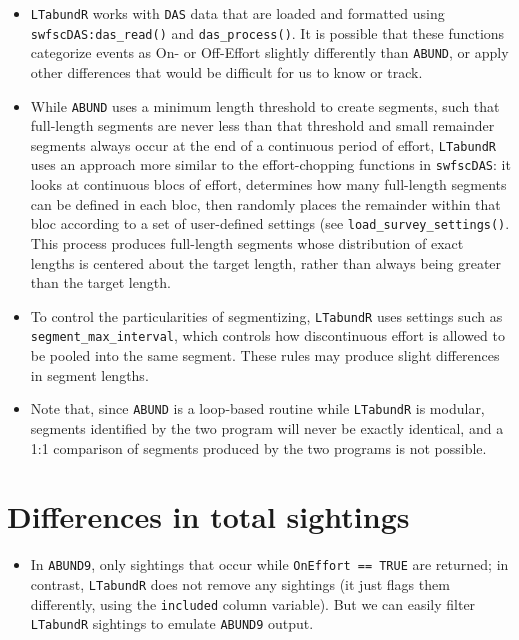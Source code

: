 \documentclass[
]{book}
\providecommand{\tightlist}{%
  \setlength{\itemsep}{0pt}\setlength{\parskip}{0pt}}
\begin{document}
\begin{itemize}
\item
  \texttt{LTabundR} works with \texttt{DAS} data that are loaded and formatted using \texttt{swfscDAS:das\_read()} and \texttt{das\_process()}. It is possible that these functions categorize events as On- or Off-Effort slightly differently than \texttt{ABUND}, or apply other differences that would be difficult for us to know or track.
\item
  While \texttt{ABUND} uses a minimum length threshold to create segments, such that full-length segments are never less than that threshold and small remainder segments always occur at the end of a continuous period of effort, \texttt{LTabundR} uses an approach more similar to the effort-chopping functions in \texttt{swfscDAS}: it looks at continuous blocs of effort, determines how many full-length segments can be defined in each bloc, then randomly places the remainder within that bloc according to a set of user-defined settings (see \texttt{load\_survey\_settings()}. This process produces full-length segments whose distribution of exact lengths is centered about the target length, rather than always being greater than the target length.
\item
  To control the particularities of segmentizing, \texttt{LTabundR} uses settings such as \texttt{segment\_max\_interval}, which controls how discontinuous effort is allowed to be pooled into the same segment. These rules may produce slight differences in segment lengths.
\item
  Note that, since \texttt{ABUND} is a loop-based routine while \texttt{LTabundR} is modular, segments identified by the two program will never be exactly identical, and a 1:1 comparison of segments produced by the two programs is not possible.
\end{itemize}

\hypertarget{differences-in-total-sightings}{%
\section*{Differences in total sightings}\label{differences-in-total-sightings}}

\begin{itemize}
\tightlist
\item
  In \texttt{ABUND9}, only sightings that occur while \texttt{OnEffort\ ==\ TRUE} are returned; in contrast, \texttt{LTabundR} does not remove any sightings (it just flags them differently, using the \texttt{included} column variable). But we can easily filter \texttt{LTabundR} sightings to emulate \texttt{ABUND9} output.
\end{itemize}
\end{document}
